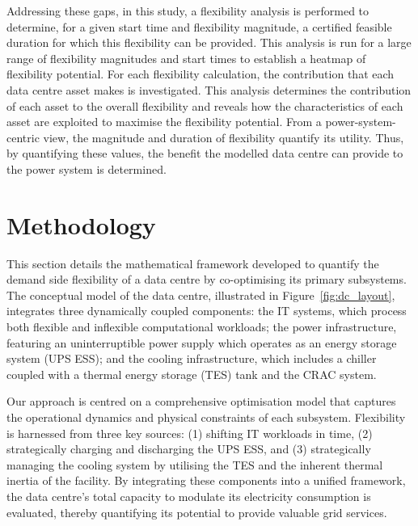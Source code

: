 \documentclass[lettersize,journal]{IEEEtran}
\providecommand{\DIFadd}[1]{{\color{blue}#1}}
\providecommand{\DIFaddbegin}{}
\providecommand{\DIFaddend}{}
\begin{document}
Addressing these gaps, in this study, a flexibility analysis is performed to determine, for a given start time and flexibility magnitude,  \DIFaddbegin \DIFadd{a certified feasible }\DIFaddend duration for which this flexibility can be provided. This analysis is run for a large range of flexibility magnitudes and start times to establish a heatmap of flexibility potential. For each flexibility calculation, the contribution that each  \DIFaddbegin \DIFadd{data centre }\DIFaddend asset makes is investigated. This analysis determines the contribution of each asset to the overall flexibility and reveals how the characteristics of each asset are exploited to maximise the flexibility potential. From a power-system-centric view, the magnitude and duration of flexibility  \DIFaddbegin \DIFadd{quantify }\DIFaddend its utility. Thus, by quantifying these values, the benefit the model\DIFaddbegin \DIFadd{led}\DIFaddend{}  data centre can provide to the power system is determined. 

\section{Methodology}
This section details the mathematical framework developed to quantify the  \DIFaddbegin \DIFadd{demand side }\DIFaddend flexibility of a data centre by co-optimising its primary subsystems. The conceptual model of the data centre, illustrated in Figure~\ref{fig:dc_layout}, integrates three dynamically coupled components: the IT systems, which process both flexible and inflexible computational workloads; the power infrastructure, featuring an  \DIFaddbegin \DIFadd{uninterruptible power supply }\DIFaddend which operates as an  \DIFaddbegin \DIFadd{energy storage system (UPS ESS}\DIFaddend ); and the cooling infrastructure, which includes a chiller coupled with a  \DIFaddbegin \DIFadd{thermal energy storage }\DIFaddend (TES) tank and the CRAC system. 

Our approach is centred on a comprehensive optimisation model that captures the operational dynamics and physical constraints of each subsystem. Flexibility is harnessed from three key sources: (1) shifting IT workloads in time, (2) strategically charging and discharging the  \DIFaddbegin \DIFadd{UPS ESS}\DIFaddend , and (3) strategically managing the cooling system by utilising the TES and the inherent thermal inertia of the facility. By integrating these components into a unified framework, the data centre's total capacity to modulate its electricity consumption is evaluated, thereby quantifying its potential to provide valuable grid services.
\end{document}
